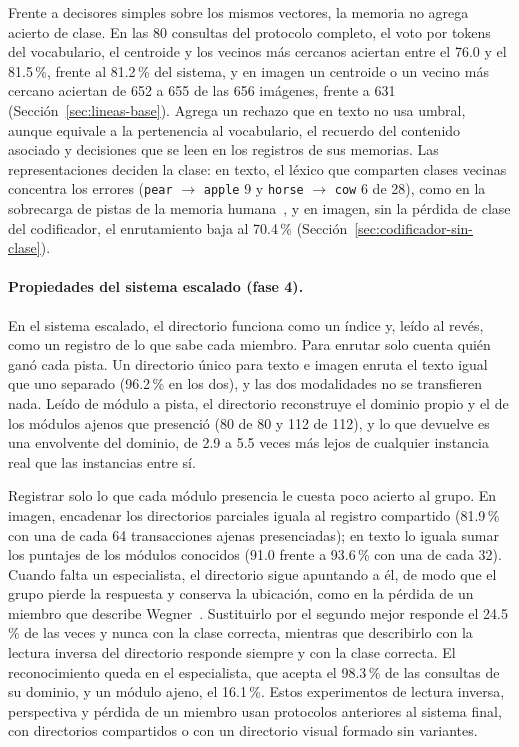 Frente a decisores simples sobre los mismos vectores, la memoria no agrega acierto de
clase.
En las 80 consultas del protocolo completo, el voto por tokens del vocabulario, el
centroide y los vecinos más cercanos aciertan entre el 76.0 y el 81.5\,\%, frente al
81.2\,\% del sistema, y en imagen un centroide o un vecino más cercano aciertan de 652 a
655 de las 656 imágenes, frente a 631 (Sección~\ref{sec:lineas-base}).
Agrega un rechazo que en texto no usa umbral, aunque equivale a la pertenencia
al vocabulario, el recuerdo del contenido asociado y decisiones que se leen en los
registros de sus memorias.
Las representaciones deciden la clase: en texto, el léxico que comparten clases vecinas
concentra los errores (\texttt{pear} $\to$ \texttt{apple} 9 y \texttt{horse} $\to$
\texttt{cow} 6 de 28), como en la sobrecarga de pistas de la memoria
humana~\cite{watkins1975buildup}, y en imagen, sin la pérdida de clase del codificador, el
enrutamiento baja al 70.4\,\% (Sección~\ref{sec:codificador-sin-clase}).

\paragraph{Propiedades del sistema escalado (fase 4).}
En el sistema escalado, el directorio funciona como un índice y, leído al revés, como un
registro de lo que sabe cada miembro.
Para enrutar solo cuenta quién ganó cada pista.
Un directorio único para texto e imagen enruta el texto igual que uno separado (96.2\,\%
en los dos), y las dos modalidades no se transfieren nada.
Leído de módulo a pista, el directorio reconstruye el dominio propio y el de los módulos
ajenos que presenció (80 de 80 y 112 de 112), y lo que devuelve es una envolvente del
dominio, de 2.9 a 5.5 veces más lejos de cualquier instancia real que las instancias
entre sí.

Registrar solo lo que cada módulo presencia le cuesta poco acierto al grupo.
En imagen, encadenar los directorios parciales iguala al registro compartido (81.9\,\%
con una de cada 64 transacciones ajenas presenciadas); en texto lo iguala sumar los
puntajes de los módulos conocidos (91.0 frente a 93.6\,\% con una de cada 32).
Cuando falta un especialista, el directorio sigue apuntando a él, de modo que el grupo
pierde la respuesta y conserva la ubicación, como en la pérdida de un miembro que
describe Wegner~\cite{wegner1987transactive}.
Sustituirlo por el segundo mejor responde el 24.5\,\% de las veces y nunca con la clase
correcta, mientras que describirlo con la lectura inversa del directorio responde siempre
y con la clase correcta.
El reconocimiento queda en el especialista, que acepta el 98.3\,\% de las
consultas de su dominio, y un módulo ajeno, el 16.1\,\%.
Estos experimentos de lectura inversa, perspectiva y pérdida de un miembro usan
protocolos anteriores al sistema final, con directorios compartidos o con un directorio
visual formado sin variantes.

